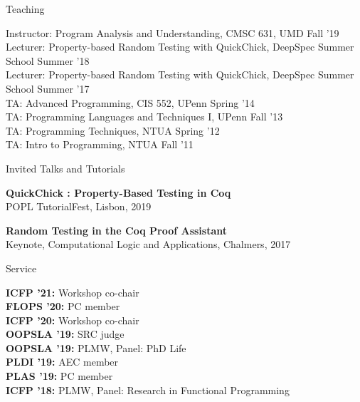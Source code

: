 \documentclass{resume} %
\begin{document}

\newcommand{\teach}[3]{
  {#1: #2} \hfill #3 \\
  }

\begin{rSection}{Teaching}

  \teach{Instructor}{Program Analysis and Understanding, CMSC 631, UMD}{Fall '19}
  \teach{Lecturer}{Property-based Random Testing with QuickChick, DeepSpec Summer School}{Summer '18}
  \teach{Lecturer}{Property-based Random Testing with QuickChick, DeepSpec Summer School}{Summer '17}  
  \teach{TA}{Advanced Programming, CIS 552, UPenn}{Spring '14}
  \teach{TA}{Programming Languages and Techniques I, UPenn}{Fall '13}
  \teach{TA}{Programming Techniques, NTUA}{Spring '12}
  \teach{TA}{Intro to Programming, NTUA}{Fall '11}
\end{rSection}



\newcommand{\talk}[3]{
  {\bf #1} \\ %
  {#3}
  }


\begin{rSection}{Invited Talks and Tutorials}

\talk{QuickChick : Property-Based Testing in Coq}
    {QuickChickTutorial.pdf}
    {POPL TutorialFest, Lisbon, 2019}

\talk{Random Testing in the Coq Proof Assistant}
     {InvitedCLA.pdf}
     {Keynote, Computational Logic and Applications, Chalmers, 2017}

\end{rSection}

\pagebreak


\newcommand{\serve}[2]{
  {\bf #1:} #2 \\
  }


\begin{rSection}{Service}

  \serve{ICFP '21}{Workshop co-chair}
  \serve{FLOPS '20}{PC member}
  \serve{ICFP '20}{Workshop co-chair}
  \serve{OOPSLA '19}{SRC judge}
  \serve{OOPSLA '19}{PLMW, Panel: PhD Life}
  \serve{PLDI '19}{AEC member}
  \serve{PLAS '19}{PC member}
  \serve{ICFP '18}{PLMW, Panel: Research in Functional Programming}
  
\end{rSection}
\end{document}
